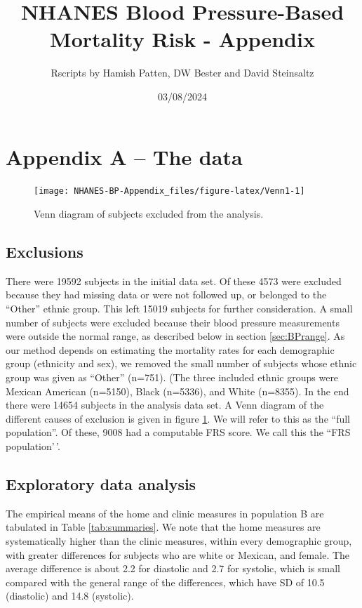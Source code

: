 \documentclass[
]{article}
\title{NHANES Blood Pressure-Based Mortality Risk - Appendix}
\author{Rscripts by Hamish Patten, DW Bester and David Steinsaltz}
\date{03/08/2024}
\begin{document}
\maketitle

{
\setcounter{tocdepth}{3}
\tableofcontents
}
\section{Appendix A -- The data}\label{appendix-a-the-data}

\begin{figure}

{\centering \texttt{[image: NHANES-BP-Appendix\_files/figure-latex/Venn1-1]} 

}

\caption{Venn diagram of subjects excluded from the analysis.}\label{fig:Venn1}
\end{figure}

\subsection{Exclusions}\label{exclusions}

There were 19592 subjects in the initial data set.
Of these 4573 were excluded because they had missing data or were not followed up, or belonged to the ``Other'' ethnic group.
This left 15019 subjects for further consideration.
A small number of subjects were excluded because their blood pressure measurements were outside the normal range, as described below in section \ref{sec:BPrange}.
As our method depends on estimating the mortality rates for each demographic group (ethnicity and sex),
we removed the small number of subjects whose ethnic group was given as ``Other'' (n=751).
(The three included ethnic groups were Mexican American (n=5150), Black (n=5336), and White (n=8355).
In the end there were 14654 subjects in the analysis data set.
A Venn diagram of the different causes of exclusion is given in figure \ref{fig:Venn1}.
We will refer to this as the ``full population''.
Of these, 9008 had a computable FRS score.
We call this the ``FRS population'\,'.

\subsection{Exploratory data analysis}\label{exploratory-data-analysis}

The empirical means of the home and clinic measures in population B are tabulated in Table \ref{tab:summaries}. We note that the home measures are systematically higher than the clinic measures, within every demographic group, with greater differences for subjects who are white or Mexican, and female.
The average difference is about 2.2 for diastolic and 2.7 for systolic, which is small compared with the general range of the differences, which have SD of
10.5 (diastolic) and 14.8 (systolic).
\end{document}
